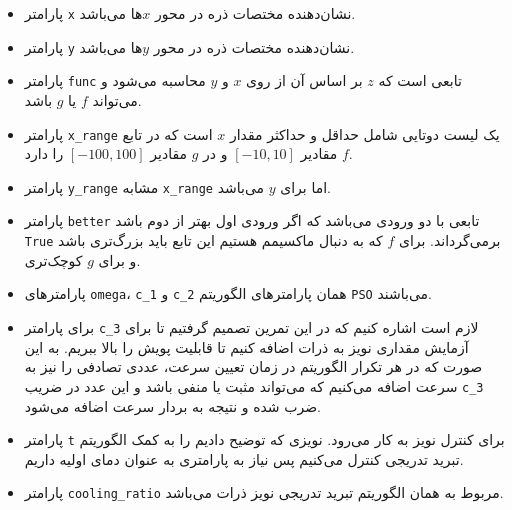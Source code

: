 \documentclass[a4paper, 12pt]{article}
\begin{document}
\begin{itemize}
    \item پارامتر
          \texttt{x}
          نشان‌دهنده مختصات ذره در محور
          $x$ها
          می‌باشد.
    \item پارامتر
          \texttt{y}
          نشان‌دهنده مختصات ذره در محور
          $y$ها
          می‌باشد.
    \item پارامتر
          \texttt{func}
          تابعی است که
          $z$
          بر اساس آن از روی
          $x$
          و
          $y$
          محاسبه می‌شود و می‌تواند
          $f$
          یا
          $g$
          باشد.
    \item پارامتر
          \texttt{x\_range}
          یک لیست دوتایی شامل حداقل و حداکثر مقدار
          $x$
          است که در تابع
          $f$
          مقادیر
          $[-10, 10]$
          و در
          $g$
          مقادیر
          $[-100, 100]$
          را دارد.
    \item پارامتر
          \texttt{y\_range}
          مشابه
          \texttt{x\_range}
          اما برای
          $y$
          می‌باشد.
    \item پارامتر
          \texttt{better}
          تابعی با دو ورودی می‌باشد که اگر ورودی اول بهتر از دوم باشد
          \texttt{True}
          برمی‌گرداند. برای
          $f$
          که به دنبال ماکسیمم هستیم این تابع باید بزرگ‌تری باشد و برای
          $g$
          کوچک‌تری.
    \item پارامترهای
          \texttt{omega}،
          \texttt{c\_1}
          و
          \texttt{c\_2}
          همان پارامترهای الگوریتم
          \texttt{PSO}
          می‌باشند.
    \item برای پارامتر
          \texttt{c\_3}
          لازم است اشاره کنیم که در این تمرین تصمیم گرفتیم تا برای آزمایش مقداری نویز به ذرات اضافه کنیم تا قابلیت پویش را بالا ببریم. به این صورت که در هر تکرار الگوریتم در زمان تعیین سرعت، عددی تصادفی را نیز به سرعت اضافه می‌کنیم که می‌تواند مثبت یا منفی باشد و این عدد در ضریب
          \texttt{c\_3}
          ضرب شده و نتیجه به بردار سرعت اضافه می‌شود.
    \item پارامتر
          \texttt{t}
          برای کنترل نویز به کار می‌رود. نویزی که توضیح دادیم را به کمک الگوریتم تبرید تدریجی کنترل می‌کنیم پس نیاز به پارامتری به عنوان دمای اولیه داریم.
    \item پارامتر
          \texttt{cooling\_ratio}
          مربوط به همان الگوریتم تبرید تدریجی نویز ذرات می‌باشد.
\end{itemize}
\end{document}
